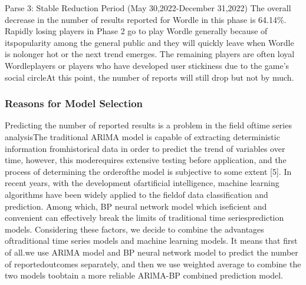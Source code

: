 \documentclass[12pt]{ctexart}
\begin{document}


\raisebox{-0.8ex}{\scalebox{2.2}{\textbullet}}\hspace{0.5em} Parse 3: Stable Reduction Period (May 30,2022-December 31,2022)
The overall decrease in the number of results reported for Wordle in this phase is 64.14\%. Rapidly losing players in Phase 2 go to play Wordle generally because of itspopularity among the general public and they will quickly leave when Wordle is nolonger hot or the next trend emerges. The remaining players are often loyal Wordleplayers or players who have developed user stickiness due to the game's social circleAt this point, the number of reports will still drop but not by much.


\subsubsection{Reasons for Model Selection}
Predicting the number of reported results is a problem in the field oftime series analysisThe traditional ARlMA model is capable of extracting deterministic information fromhistorical data in order to predict the trend of variables over time, however, this moderequires extensive testing before application, and the process of determining the orderofthe model is subjective to some extent [5]. In recent years, with the development ofartificial intelligence, machine learning algorithms have been widely applied to the fieldof data classification and prediction. Among which, BP neural network model which iseficient and convenient can effectively break the limits of traditional time seriesprediction models. Considering these factors, we decide to combine the advantages oftraditional time series models and machine learning models. It means that first of all.we use ARlMA model and BP neural network model to predict the number of reportedoutcomes separately, and then we use weighted average to combine the two models toobtain a more reliable ARlMA-BP combined prediction model.
\end{document}
